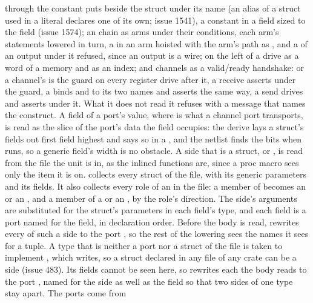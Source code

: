 through the  constant  puts
beside the struct under its name (an alias of a struct used in a
literal declares one of its own; issue 1541), a constant in a field
sized to the field (issue 1574); an  chain
as arms under their conditions, each arm's statements lowered in
turn, a  in an arm hoisted with the arm's path as
, and a  of an output under it refused, since
an output is a wire; 
on the left of a drive as a word of a memory and 
as an index; and channels as a valid/ready handshake:  or
a channel's  is the guard on every register drive after
it, a receive asserts  under the guard, a 
binds  and  to its two names and asserts
 the same way, a send drives
 and asserts  under it. What it does not read
it refuses with a message that names the construct.
A field of a port's value,  where  is what a
channel port transports, is read as the slice of the port's data the
field occupies: the  derive lays a struct's fields out
first field highest and says so in a , and the netlist
finds the bits when  runs, so a generic field's width
is no obstacle.
A side that is a struct,  or
, is read from the file the unit is in, as
the inlined functions are, since a proc macro sees only the item it
is on.  collects every struct of the file,
with its generic parameters and its fields. It also collects every
role of an  in the file: a member of 
becomes an  or an , and a member of  a
 or an , by the role's direction. The side's
arguments are substituted for the struct's parameters in each field's
type, and each field is a port named for the field, in declaration
order. Before the body is read,  rewrites every
 of such a side to the port , so the rest of the
lowering sees the names it sees for a tuple. A type that is neither a
port nor a struct of the file is taken to implement ,
which  writes, so a struct declared in any
file of any crate can be a side (issue 483). Its fields cannot be
seen here, so  rewrites each  the body
reads to the port , named for the side as well as the
field so that two sides of one type stay apart. The ports come from
